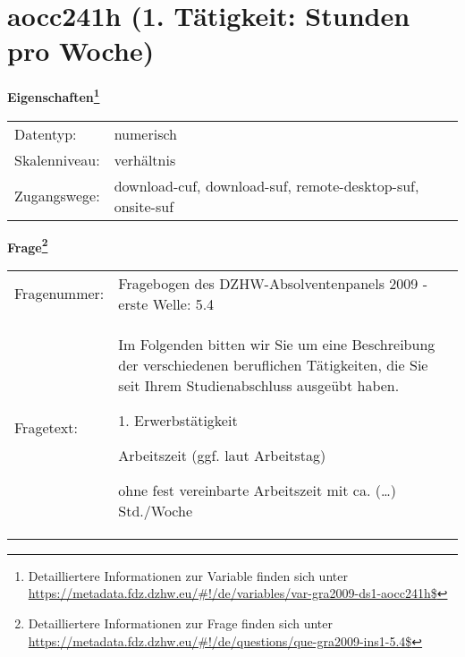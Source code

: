 
    \setcounter{footnote}{0}

    \vspace*{-1.8cm}
	\section{aocc241h (1. Tätigkeit: Stunden pro Woche)}
	\label{section:aocc241h}



    \vspace*{0.5cm}
    \noindent\textbf{Eigenschaften\footnote{Detailliertere Informationen zur Variable finden sich unter
		\url{https://metadata.fdz.dzhw.eu/\#!/de/variables/var-gra2009-ds1-aocc241h$}}}\\
	\begin{tabularx}{\hsize}{@{}lX}
	Datentyp: & numerisch \\
	Skalenniveau: & verhältnis \\
	Zugangswege: &
	  download-cuf, 
	  download-suf, 
	  remote-desktop-suf, 
	  onsite-suf
 \\
    \end{tabularx}



				\vspace*{0.5cm}
                \noindent\textbf{Frage\footnote{Detailliertere Informationen zur Frage finden sich unter
		              \url{https://metadata.fdz.dzhw.eu/\#!/de/questions/que-gra2009-ins1-5.4$}}}\\
				\begin{tabularx}{\hsize}{@{}lX}
					Fragenummer: &
					  Fragebogen des DZHW-Absolventenpanels 2009 - erste Welle:
					  5.4
 \\
					Fragetext: & Im Folgenden bitten wir Sie um eine Beschreibung der verschiedenen beruflichen Tätigkeiten, die Sie seit Ihrem Studienabschluss ausgeübt haben.\par  1. Erwerbstätigkeit\par  Arbeitszeit (ggf. laut Arbeitstag)\par  ohne fest vereinbarte Arbeitszeit mit ca. (…) Std./Woche \\
				\end{tabularx}





